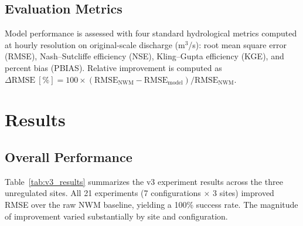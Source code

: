 \documentclass[draft]{agujournal2019}
\begin{document}
\subsection{Evaluation Metrics}

Model performance is assessed with four standard hydrological metrics computed at hourly resolution on original-scale discharge (m$^{3}$/s): root mean square error (RMSE), Nash--Sutcliffe efficiency (NSE), Kling--Gupta efficiency (KGE), and percent bias (PBIAS). Relative improvement is computed as $\Delta\text{RMSE}~[\%] = 100 \times (\text{RMSE}_{\text{NWM}} - \text{RMSE}_{\text{model}}) / \text{RMSE}_{\text{NWM}}$.



\section{Results}

\subsection{Overall Performance}

Table~\ref{tab:v3_results} summarizes the v3 experiment results across the three unregulated sites. All 21 experiments (7 configurations $\times$ 3 sites) improved RMSE over the raw NWM baseline, yielding a 100\% success rate. The magnitude of improvement varied substantially by site and configuration.
\end{document}
